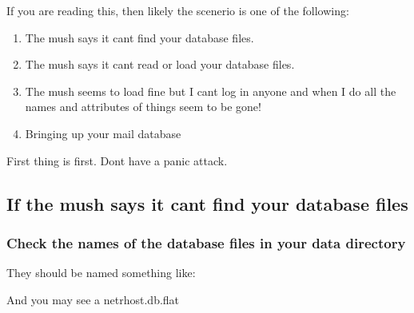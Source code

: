 \documentclass[letterpaper,10pt,english]{sphinxmanual}
\begin{document}
\sphinxAtStartPar
If you are reading this, then likely the scenerio is one of the following:
\begin{enumerate}
%
\item {} 
\sphinxAtStartPar
The mush says it can\textquotesingle{}t find your database files.

\item {} 
\sphinxAtStartPar
The mush says it can\textquotesingle{}t read or load your database files.

\item {} 
\sphinxAtStartPar
The mush seems to load fine but I can\textquotesingle{}t log in anyone and when I do
all the names and attributes of things seem to be gone!

\item {} 
\sphinxAtStartPar
Bringing up your mail database

\end{enumerate}

\sphinxAtStartPar
First thing is first.  Don\textquotesingle{}t have a panic attack.


\subsection{If the mush says it can\textquotesingle{}t find your database files}
\label{\detokenize{troubleshooting:if-the-mush-says-it-can-t-find-your-database-files}}

\subsubsection{Check the names of the database files in your \textquotesingle{}data\textquotesingle{} directory}
\label{\detokenize{troubleshooting:check-the-names-of-the-database-files-in-your-data-directory}}
\sphinxAtStartPar
They should be named something like:

\begin{sphinxVerbatim}[commandchars=\\\{\}]
\end{sphinxVerbatim}

\sphinxAtStartPar
And you may see a netrhost.db.flat
\end{document}
